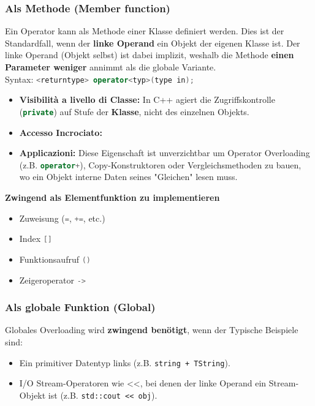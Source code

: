 \subsubsection{Als Methode (Member function)}

Ein Operator kann als Methode einer Klasse definiert werden. 
Dies ist der Standardfall, wenn der \textbf{linke Operand} ein Objekt der eigenen Klasse ist.
Der linke Operand (Objekt selbst) ist dabei implizit, weshalb die Methode \textbf{einen Parameter weniger} annimmt als die globale Variante.\\
Syntax: \lstinline[language=C++]|<returntype> operator<typ>(type in);|
\begin{itemize}
    \item \textbf{Visibilità a livello di Classe:} In C++ agiert die Zugriffskontrolle (\lstinline[language=C++]|private|) auf Stufe der \textbf{Klasse}, nicht des einzelnen Objekts.
    \item \textbf{Accesso Incrociato:} 
    \item \textbf{Applicazioni:} Diese Eigenschaft ist unverzichtbar um Operator Overloading (z.B. \lstinline[language=C++]|operator+|), Copy-Konstruktoren oder Vergleichsmethoden zu bauen, wo ein Objekt interne Daten seines "Gleichen" lesen muss.
\end{itemize}



\textbf{Zwingend als Elementfunktion zu implementieren}
\begin{itemize}
    \item Zuweisung (\lstinline[language=C++]|=|, \lstinline[language=C++]|+=|, etc.)
    \item Index \lstinline[language=C++]|[]|
    \item Funktionsaufruf \lstinline[language=C++]|()|
    \item Zeigeroperator \lstinline[language=C++]|->|
\end{itemize}

\subsubsection{Als globale Funktion (Global)}

Globales Overloading wird \textbf{zwingend benötigt}, wenn der  Typische Beispiele sind:
\begin{itemize}
    \item Ein primitiver Datentyp links (z.B. \verb|string + TString|).
    \item I/O Stream-Operatoren wie \textless{}\textless{}, bei denen der linke Operand ein Stream-Objekt ist (z.B. \verb|std::cout << obj|).
\end{itemize}


